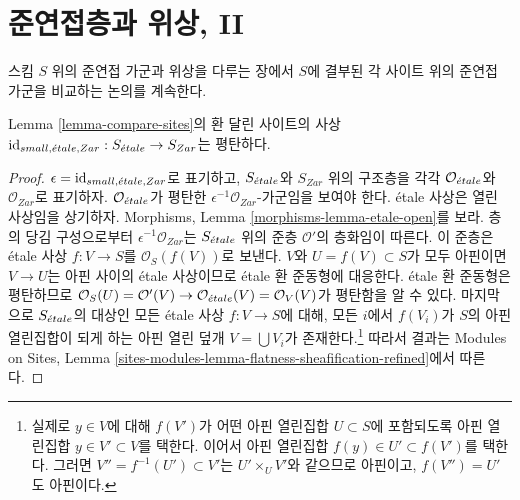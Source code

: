 \section{준연접층과 위상, II}
\label{section-quasi-coherent-sheaves-bis}

\noindent
스킴 $S$ 위의 준연접 가군과 위상을 다루는 장에서 $S$에 결부된
각 사이트 위의 준연접 가군을 비교하는 논의를 계속한다.


\begin{lemma}
\label{lemma-compare-etale-zariski-flat}
Lemma \ref{lemma-compare-sites}의 환 달린 사이트의 사상
$\text{id}_{small, {\acute{e}tale}, Zar} : S_{\acute{e}tale} \to S_{Zar}$는 평탄하다.
\end{lemma}

\begin{proof}
$\epsilon = \text{id}_{small, {\acute{e}tale}, Zar}$로 표기하고, $S_{\acute{e}tale}$와
$S_{Zar}$ 위의 구조층을 각각 $\mathcal{O}_{\acute{e}tale}$와
$\mathcal{O}_{Zar}$로 표기하자. $\mathcal{O}_{\acute{e}tale}$가 평탄한
$\epsilon^{-1}\mathcal{O}_{Zar}$-가군임을 보여야 한다. \'etale 사상은
열린 사상임을 상기하자. Morphisms, Lemma
\ref{morphisms-lemma-etale-open}를 보라. 층의 당김 구성으로부터
$\epsilon^{-1}\mathcal{O}_{Zar}$는 $S_{\acute{e}tale}$ 위의 준층
$\mathcal{O}'$의 층화임이 따른다. 이 준층은 \'etale 사상
$f : V \to S$를 $\mathcal{O}_S(f(V))$로 보낸다. $V$와
$U = f(V) \subset S$가 모두 아핀이면 $V \to U$는 아핀 사이의
\'etale 사상이므로 \'etale 환 준동형에 대응한다. \'etale 환 준동형은
평탄하므로
$\mathcal{O}_S(U) = \mathcal{O}'(V) \to
\mathcal{O}_{\acute{e}tale}(V) = \mathcal{O}_V(V)$가 평탄함을 알 수 있다.
마지막으로 $S_{\acute{e}tale}$의 대상인 모든 \'etale 사상 $f : V \to S$에 대해,
모든 $i$에서 $f(V_i)$가 $S$의 아핀 열린집합이 되게 하는 아핀 열린 덮개
$V = \bigcup V_i$가 존재한다.\footnote{실제로 $y \in V$에 대해
$f(V')$가 어떤 아핀 열린집합 $U \subset S$에 포함되도록 아핀 열린집합
$y \in V' \subset V$를 택한다. 이어서 아핀 열린집합
$f(y) \in U' \subset f(V')$를 택한다. 그러면
$V'' = f^{-1}(U') \subset V'$는 $U' \times_U V'$와 같으므로 아핀이고,
$f(V'') = U'$도 아핀이다.} 따라서 결과는 Modules on Sites, Lemma
\ref{sites-modules-lemma-flatness-sheafification-refined}에서 따른다.
\end{proof}


